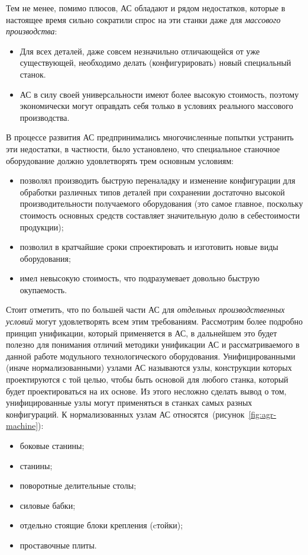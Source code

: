 Тем не менее, помимо плюсов, АС обладают и рядом недостатков, которые в настоящее время сильно сократили спрос на эти станки даже для \textit{массового производства}:

\begin{itemize}
	\item Для всех деталей, даже совсем незначильно отличающейся от уже существующей, необходимо делать (конфигурировать) новый специальный станок.
	\item АС в силу своей универсальности имеют более высокую стоимость, поэтому экономически могут оправдать себя только в условиях реального массового производства.
\end{itemize}


В процессе развития АС предпринимались многочисленные попытки устранить эти недостатки, в частности, было установлено, что специальное станочное оборудование должно удовлетворять трем основным условиям:

\begin{itemize}
\item позволял производить быструю переналадку и изменение конфигурации для обработки различных типов деталей при сохранении достаточно высокой производительности получаемого оборудования (это самое главное, поскольку стоимость основных средств составляет значительную долю в себестоимости продукции);
\item позволил в кратчайшие сроки спроектировать и изготовить новые виды оборудования;
\item имел невысокую стоимость, что подразумевает довольно быструю окупаемость.
\end{itemize} 


Стоит отметить, что по большей части АС для \textit{отдельных производственных условий} могут удовлетворять всем этим требованиям. Рассмотрим более подробно принцип унификации, который применяется в АС, в дальнейшем это будет полезно для понимания отличий методики унификации АС и рассматриваемого в данной работе модульного технологического оборудования. Унифицированными (иначе нормализованными) узлами АС называются узлы, конструкции которых проектируются с той целью, чтобы быть основой для любого станка, который будет проектироваться на их основе. Из этого несложно сделать вывод о том, унифицированные узлы могут применяться в станках самых разных конфигураций. К нормализованных узлам АС относятся~(рисунок~\cref{fig:agr-machine}):

\begin{itemize}
	\item боковые станины;
	\item станины;
	\item поворотные делительные столы;
	\item силовые бабки;
	\item отдельно стоящие блоки крепления (cтойки); 
	\item проставочные плиты.
\end{itemize}

